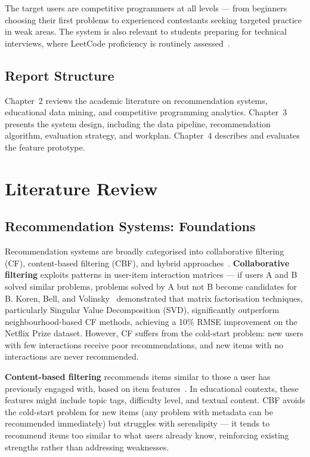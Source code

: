 \documentclass[12pt,a4paper]{article}
\begin{document}
The target users are competitive programmers at all levels --- from beginners choosing their first problems to experienced contestants seeking targeted practice in weak areas. The system is also relevant to students preparing for technical interviews, where LeetCode proficiency is routinely assessed~\cite{liang2021}.

\subsection{Report Structure}

Chapter~2 reviews the academic literature on recommendation systems, educational data mining, and competitive programming analytics. Chapter~3 presents the system design, including the data pipeline, recommendation algorithm, evaluation strategy, and workplan. Chapter~4 describes and evaluates the feature prototype.

\section{Literature Review}

\subsection{Recommendation Systems: Foundations}

Recommendation systems are broadly categorised into collaborative filtering (CF), content-based filtering (CBF), and hybrid approaches~\cite{ricci2015}. \textbf{Collaborative filtering} exploits patterns in user-item interaction matrices --- if users A and B solved similar problems, problems solved by A but not B become candidates for B. Koren, Bell, and Volinsky~\cite{koren2009} demonstrated that matrix factorisation techniques, particularly Singular Value Decomposition (SVD), significantly outperform neighbourhood-based CF methods, achieving a 10\% RMSE improvement on the Netflix Prize dataset. However, CF suffers from the cold-start problem: new users with few interactions receive poor recommendations, and new items with no interactions are never recommended.

\textbf{Content-based filtering} recommends items similar to those a user has previously engaged with, based on item features~\cite{lops2011}. In educational contexts, these features might include topic tags, difficulty level, and textual content. CBF avoids the cold-start problem for new items (any problem with metadata can be recommended immediately) but struggles with serendipity --- it tends to recommend items too similar to what users already know, reinforcing existing strengths rather than addressing weaknesses.
\end{document}
